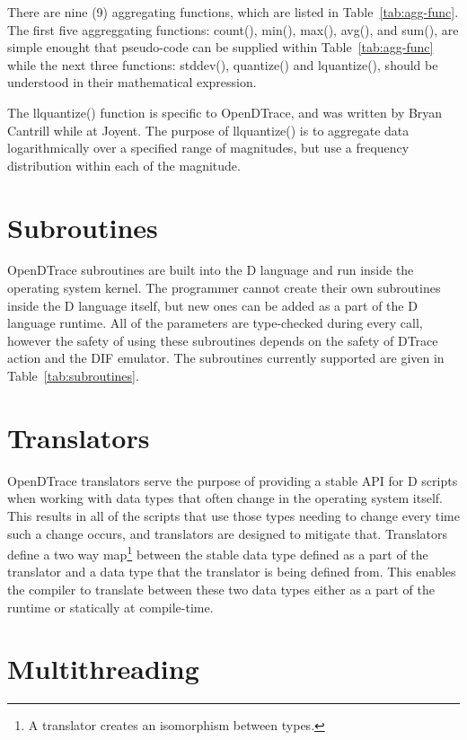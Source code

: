 There are nine (9) aggregating functions, which are listed in
Table~\ref{tab:agg-func}.  The first five aggreggating functions:
count(), min(), max(), avg(), and sum(), are simple enought that
pseudo-code can be supplied within Table~\ref{tab:agg-func} while the
next three functions: stddev(), quantize() and lquantize(), should be
understood in their mathematical expression.

The llquantize() function is specific to OpenDTrace, and was written
by Bryan Cantrill while at Joyent.  The purpose of llquantize() is to
aggregate data logarithmically over a specified range of magnitudes,
but use a frequency distribution within each of the magnitude.

\section{Subroutines}
\label{sec:subroutines}

OpenDTrace subroutines are built into the D language and run inside the
operating system kernel. The programmer cannot create their own subroutines
inside the D language itself, but new ones can be added as a part of the D
language runtime. All of the parameters are type-checked during every call,
however the safety of using these subroutines depends on the safety of DTrace
action and the DIF emulator. The subroutines currently supported are given
in Table~\ref{tab:subroutines}.

\section{Translators}
\label{sec:translators}

OpenDTrace translators serve the purpose of providing a stable API for D scripts
when working with data types that often change in the operating system itself.
This results in all of the scripts that use those types needing to change every
time such a change occurs, and translators are designed to mitigate that. Translators
define a two way map\footnote{A translator creates an isomorphism between types.}
between the stable data type defined as a part of the translator and a data type that
the translator is being defined from. This enables the compiler to translate between
these two data types either as a part of the runtime or statically at compile-time.

\section{Multithreading}

